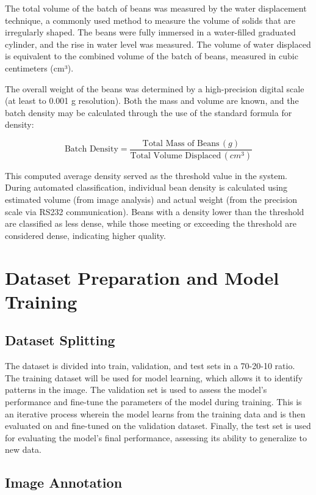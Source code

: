The total volume of the batch of beans was measured by the water displacement technique, a commonly used method to measure the volume of solids that are irregularly shaped. The beans were fully immersed in a water-filled graduated cylinder, and the rise in water level was measured. The volume of water displaced is equivalent to the combined volume of the batch of beans, measured in cubic centimeters (cm³).

The overall weight of the beans was determined by a high-precision digital scale (at least to 0.001 g resolution). Both the mass and volume are known, and the batch density may be calculated through the use of the standard formula for density:

\[
\text{Batch Density} = \frac{\text{Total Mass of Beans} \, (g)}{\text{Total Volume Displaced} \, (cm^3)}
\]

This computed average density served as the threshold value in the system. During automated classification, individual bean density is calculated using estimated volume (from image analysis) and actual weight (from the precision scale via RS232 communication). Beans with a density lower than the threshold are classified as less dense, while those meeting or exceeding the threshold are considered dense, indicating higher quality.



\section{Dataset Preparation and Model Training}
\label{sec:dataset_prep_and_model_training}
\subsection{Dataset Splitting}

The dataset is divided into train, validation, and test sets in a 70-20-10 ratio. The training dataset will be used for model learning, which allows it to identify patterns in the image. The validation set is used to assess the model’s performance and fine-tune the parameters of the model during training. This is an iterative process wherein the model learns from the training data and is then evaluated on and fine-tuned on the validation dataset. Finally, the test set is used for evaluating the model’s final performance, assessing its ability to generalize to new data.

\subsection{Image Annotation}

